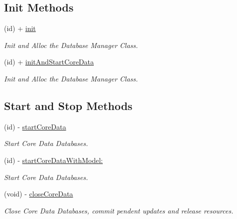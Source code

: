 \subsection*{Init Methods}
\begin{DoxyCompactItemize}
\item 
(id) + \hyperlink{interface_j_p_d_b_manager_ad0fb072393aa238cb15f0fe71cae5034}{init}
\begin{DoxyCompactList}\small\item\em Init and Alloc the Database Manager Class. \item\end{DoxyCompactList}\item 
(id) + \hyperlink{interface_j_p_d_b_manager_add8b93f9565ad8b497a81d2cbdaa4301}{initAndStartCoreData}
\begin{DoxyCompactList}\small\item\em Init and Alloc the Database Manager Class. \item\end{DoxyCompactList}\end{DoxyCompactItemize}
\subsection*{Start and Stop Methods}
\begin{DoxyCompactItemize}
\item 
(id) -\/ \hyperlink{interface_j_p_d_b_manager_aef389466245327a533a7881fd2d54c52}{startCoreData}
\begin{DoxyCompactList}\small\item\em Start Core Data Databases. \item\end{DoxyCompactList}\item 
(id) -\/ \hyperlink{interface_j_p_d_b_manager_a3bf67f7522015669b34c6368bc836c55}{startCoreDataWithModel:}
\begin{DoxyCompactList}\small\item\em Start Core Data Databases. \item\end{DoxyCompactList}\item 
\hypertarget{interface_j_p_d_b_manager_ae3c82e3fa6e7da50efbd34357c5ddee4}{
(void) -\/ \hyperlink{interface_j_p_d_b_manager_ae3c82e3fa6e7da50efbd34357c5ddee4}{closeCoreData}}
\label{interface_j_p_d_b_manager_ae3c82e3fa6e7da50efbd34357c5ddee4}

\begin{DoxyCompactList}\small\item\em Close Core Data Databases, commit pendent updates and release resources. \item\end{DoxyCompactList}\end{DoxyCompactItemize}
